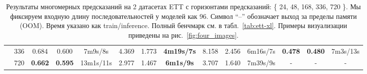 \begin{table}[!ht]
{\begin{tabular}{c|c| *{3}{c} *{3}{c} *{3}{c} *{3}{c}}
                          & 336  & 0.684 & 0.600 & 7m9s/8s & 4.369 & 1.773 & \textbf{4m19s/7s} & 8.158 & 2.456 & 6m16s/7s & \textbf{0.478} & \textbf{0.480} & 7m3s/13s \\
                          & 720  & \textbf{0.662} & \textbf{0.595} & 13m1s/11s & 2.977 & 1.467 & \textbf{6m1s/9s} & 3.707 & 1.640 & 7m39s/9s & - & - & - \\
        \bottomrule
      \end{tabular}%
    }
    \vspace{3pt}
    \caption{Результаты многомерных предсказаний на 2 датасетах ETT с 
    горизонтами предсказаний: \{ 24, 48, 168, 336, 720 \}. 
    Мы фиксируем входную длину последовательностей у моделей как 96.
    Символ “–” обозначает выход за пределы памяти (OOM).
    Время указано как train/inference.
    Полный бенчмарк см. в табл.~\ref{tab:ett-xl}.
    Примеры визуализации приведены  на рис.~\ref{fig:four_images}.}
    \label{tab:ett}
\end{table}

